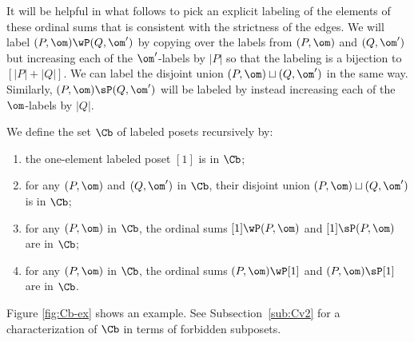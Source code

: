 It will be helpful in what follows to pick an explicit labeling of the elements of these ordinal sums that is consistent with the strictness of the edges.  We will label $(P,\om)\wP (Q,\om')$ by copying over the labels from $(P,\om)$ and $(Q,\om')$ but increasing each of the $\om'$-labels by $|P|$ so that the labeling is a bijection to $[|P|+|Q|]$.  We can label the disjoint union $(P,\om)\sqcup (Q,\om')$ in the same way.  Similarly, $(P,\om)\sP (Q,\om')$ will be labeled by instead increasing each of the $\om$-labels by $|Q|$.

\begin{definition}\label{def:C}
We define the set $\Cb$ of labeled posets recursively by:
\begin{enumerate}[label=(\alph*)]
\item\label{it42a} the one-element labeled poset $[1]$ is in $\Cb$;
\item \label{it42b} for any $(P,\om)$ and $(Q,\om')$ in $\Cb$, their disjoint union $(P,\om)\sqcup (Q,\om')$ is in $\Cb$;
\item \label{it42c} for any $(P,\om)$ in $\Cb$, the ordinal sums
$[1]\wP (P,\om)$ and $[1]\sP (P,\om)$
are in $\Cb$;
\item \label{it42d} for any $(P,\om)$ in $\Cb$, the ordinal sums
$(P,\om)\wP [1]$ and $(P,\om)\sP [1]$ 
are in $\Cb$.
\end{enumerate} 
\end{definition}
Figure \ref{fig:Cb-ex} shows an example.  See Subsection~\ref{sub:Cv2} for a characterization of $\Cb$ in terms of forbidden subposets.

